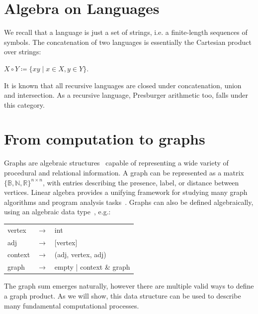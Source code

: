 \documentclass[sigplan,10pt,review,anonymous]{acmart}
\begin{document}
\section{Algebra on Languages}

We recall that a language is just a set of strings, i.e. a finite-length sequences of symbols. The concatenation of two languages is essentially the Cartesian product over strings:

$X \circ Y \coloneqq \{xy \mid x \in X, y \in Y\}$.

It is known that all recursive languages are closed under concatenation, union and intersection. As a recursive language, Presburger arithmetic too, falls under this category.

\section{From computation to graphs}\label{sec:graphs}

Graphs are algebraic structures~\cite{weisfeiler1968reduction} capable of representing a wide variety of procedural and relational information. A graph can be represented as a matrix $\{\mathbb{B}, \mathbb{N}, \mathbb{R}\}^{n\times n}$, with entries describing the presence, label, or distance between vertices. Linear algebra provides a unifying framework for studying many graph algorithms and program analysis tasks~\citep{kepner2011graph}. Graphs can also be defined algebraically, using an algebraic data type~\cite{erwig2001inductive, mokhov2017algebraic}, e.g.:\\

\begin{center}
\begin{table}[H]
\begin{tabular}{lcl}
  vertex  & $\rightarrow$ & int \\
  adj     & $\rightarrow$ & [vertex] \\
  context & $\rightarrow$ & (adj, vertex, adj) \\
  graph   & $\rightarrow$ & empty | context \& graph \\
\end{tabular}
\end{table}
\end{center}

The graph sum emerges naturally, however there are multiple valid ways to define a graph product. As we will show, this data structure can be used to describe many fundamental computational processes.
\end{document}
